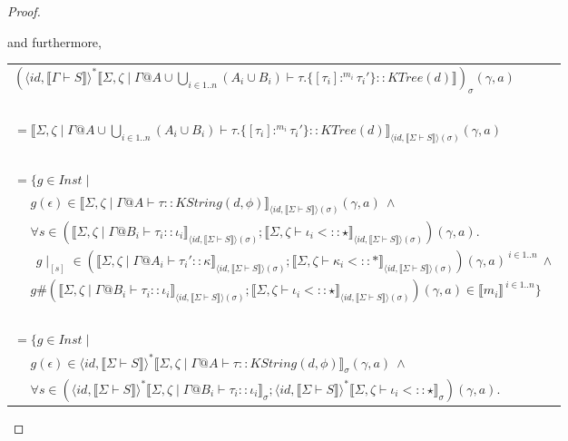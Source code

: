 \documentclass{article}
\newcommand{\sem}[1]{\llbracket #1 \rrbracket}
\begin{document}
\begin{proof}
\begin{description}
and furthermore,
\begin{center}
\begin{tabular}{l}
$(\langle \mathit{id}, \sem{\Gamma \vdash S} \rangle^* \sem{\Sigma,\zeta \mid \Gamma @ A \cup \bigcup_{i \in 1..n} (A_i \cup B_i) \vdash \tau.\{ [\tau_i] :^{m_i} \tau_i' \} :: \mathit{KTree(d)} })_\sigma (\gamma,a)$ \\~\\
$= \sem{\Sigma,\zeta \mid \Gamma @ A \cup \bigcup_{i \in 1..n} (A_i \cup B_i) \vdash \tau.\{ [\tau_i] :^{m_i} \tau_i' \} :: \mathit{KTree(d)} }_{\langle \mathit{id}, \sem{\Sigma \vdash S} \rangle(\sigma)}(\gamma,a)$ \\~\\
$= \{ g \in \mathit{Inst} \mid$ \\
$~~~~~~g(\epsilon) \in \sem{\Sigma,\zeta \mid \Gamma @ A \vdash \tau :: \mathit{KString(d,\phi)}}_{\langle \mathit{id}, \sem{\Sigma \vdash S} \rangle(\sigma)}(\gamma,a)~\wedge$ \\
$~~~~~~\forall s \in (\sem{\Sigma,\zeta \mid \Gamma @ B_i \vdash \tau_i :: \iota_i}_{\langle \mathit{id}, \sem{\Sigma \vdash S} \rangle(\sigma)};\sem{\Sigma,\zeta \vdash \iota_i <:: \star}_{\langle \mathit{id}, \sem{\Sigma \vdash S} \rangle(\sigma)})(\gamma,a).$\\
$~~~~~~~~g \! \mid_{[s]} \in (\sem{\Sigma,\zeta \mid \Gamma @ A_i \vdash \tau_i' :: \kappa}_{\langle \mathit{id}, \sem{\Sigma \vdash S} \rangle(\sigma)};\sem{\Sigma,\zeta \vdash \kappa_i <:: \ast}_{\langle \mathit{id}, \sem{\Sigma \vdash S} \rangle(\sigma)})(\gamma,a)^{~i \in 1..n}~\wedge$\\
$~~~~~~g \# (\sem{\Sigma,\zeta \mid \Gamma @ B_i \vdash \tau_i :: \iota_i}_{\langle \mathit{id}, \sem{\Sigma \vdash S} \rangle(\sigma)};\sem{\Sigma,\zeta \vdash \iota_i <:: \star}_{\langle \mathit{id}, \sem{\Sigma \vdash S} \rangle(\sigma)})(\gamma,a) \in \sem{m_i}^{~i \in 1..n} \}$\\~\\
$= \{ g \in \mathit{Inst} \mid$ \\
$~~~~~~g(\epsilon) \in \langle \mathit{id}, \sem{\Sigma \vdash S} \rangle^* \sem{\Sigma,\zeta \mid \Gamma @ A \vdash \tau :: \mathit{KString(d,\phi)}}_{\sigma}(\gamma,a)~\wedge$ \\
$~~~~~~\forall s \in (\langle \mathit{id}, \sem{\Sigma \vdash S} \rangle^* \sem{\Sigma,\zeta \mid \Gamma @ B_i \vdash \tau_i :: \iota_i}_{\sigma};\langle \mathit{id}, \sem{\Sigma \vdash S} \rangle^* \sem{\Sigma,\zeta \vdash \iota_i <:: \star}_{\sigma})(\gamma,a).$\\

\end{tabular}
\end{center}
\end{description}
\end{proof}
\end{document}
